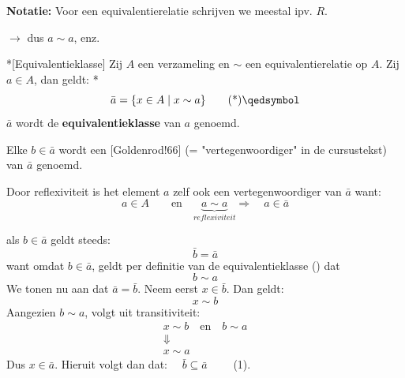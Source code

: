 \begin{barbox}[ProcessBlue][gray!1]
    \textcolor{ProcessBlue}{\textbf{Notatie:}} Voor een equivalentierelatie schrijven we meestal \inlinetext{$\sim$} ipv. $R$.

    $\to$ dus $a \sim a$, enz.
\end{barbox}

\begin{nicedefinition}*[Equivalentieklasse]\label{def:l3_equivalentieklasse}
    Zij $A$ een verzameling en $\sim$ een equivalentierelatie op $A$.\newline
    Zij $a \in A$, dan geldt:
    \nextpart[]*
    \begin{equation}
        \bar{a} = \{x \in A \mid x \sim a\} \qedtag
    \end{equation}
    $\bar{a}$ wordt de \textcolor{PineGreen!75!black}{\textbf{equivalentieklasse}} van $a$ genoemd.
\end{nicedefinition}
Elke $b \in \bar{a}$ wordt een [Goldenrod!66] (= "vertegenwoordiger" in de cursustekst) van $\bar{a}$ genoemd.

Door reflexiviteit is het element $a$ zelf ook een vertegenwoordiger van $\bar{a}$ want:
\begin{equation*}
    a \in A \qquad \text{en} \quad \underbrace{a \sim a}_{reflexiviteit} \Rightarrow \quad a \in \bar{a}
\end{equation*}

\textbf{} als $b \in \bar{a}$ geldt steeds:
\begin{equation}\label{eq:l3_bar_b_is_bar_a}
    \bar{b} = \bar{a}
\end{equation}
want omdat $b \in \bar{a}$, geldt per definitie van de equivalentieklasse () dat
\begin{equation*}
    b \sim a
\end{equation*}
We tonen nu aan dat $\bar{a} = \bar{b}$. Neem eerst $x \in \bar{b}$. Dan geldt:
\begin{equation*}
    x \sim b
\end{equation*}
Aangezien $b \sim a$, volgt uit transitiviteit:
\begin{equation*}
    \begin{gathered}
        x \sim b \quad \text{en} \quad b \sim a \\
        \Downarrow \\
        x \sim a
    \end{gathered}
\end{equation*}
Dus $x \in \bar{a}$. Hieruit volgt dan dat: $\quad \bar{b} \subseteq \bar{a}\qquad$ (1).

